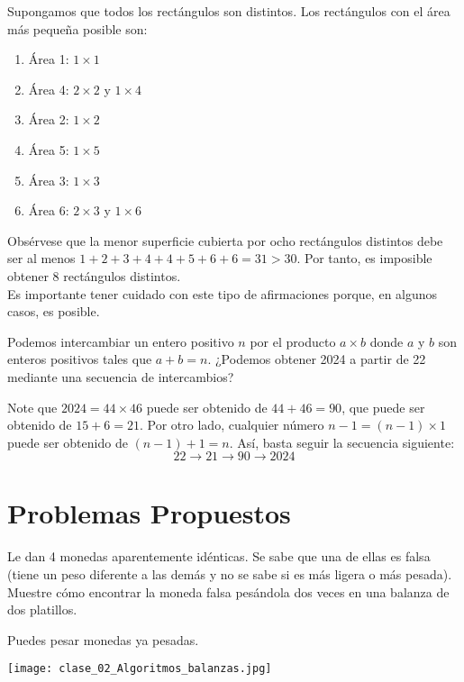 \documentclass[11pt]{scrartcl}
\begin{document}
Supongamos que todos los rectángulos son distintos. Los rectángulos con el área más pequeña posible son:
\begin{multicols}{2}
\begin{enumerate}
    \item Área 1: $1 \times 1$
    \item Área 4: $2 \times 2$ y $1 \times 4$
    \item Área 2: $1 \times 2$
    \item Área 5: $1 \times 5$
    \item Área 3: $1 \times 3$
    \item Área 6: $2 \times 3$ y $1 \times 6$
\end{enumerate}
\end{multicols}

Obsérvese que la menor superficie cubierta por ocho rectángulos distintos debe ser al menos \(1 + 2 + 3 + 4 + 4 + 5 + 6 + 6 = 31 > 30\). Por tanto, es imposible obtener 8 rectángulos distintos.\\

Es importante tener cuidado con este tipo de afirmaciones porque, en algunos casos, es
posible.

\begin{example}
Podemos intercambiar un entero positivo \( n \) por el producto \( a \times b \) donde \( a \) y \( b \) son enteros positivos tales que \( a + b = n \). ¿Podemos obtener 2024 a partir de 22 mediante una secuencia de intercambios?
\end{example}

Note que \(2024 = 44 \times 46\) puede ser obtenido de \(44 + 46 = 90\), que puede ser obtenido de \(15 + 6 = 21\). Por otro lado, cualquier número \( n - 1 = (n - 1) \times 1 \)
puede ser obtenido de \( (n - 1) + 1 = n \). Así, basta seguir la secuencia siguiente:
\[ 22 \rightarrow 21 \rightarrow 90 \rightarrow 2024 \]


\section{Problemas Propuestos}
\begin{problem}
    Le dan 4 monedas aparentemente idénticas. Se sabe que una de ellas es falsa (tiene un peso diferente a las demás y no se sabe si es más ligera o más pesada). Muestre cómo encontrar la moneda falsa pesándola dos veces en una balanza de dos platillos.
    \begin{hint}
    Puedes pesar monedas ya pesadas.
        \begin{center}
        \texttt{[image: clase\_02\_Algoritmos\_balanzas.jpg]}
        \end{center}
    \end{hint}
\end{problem}
\end{document}
